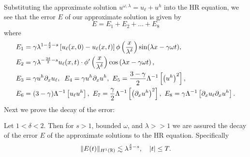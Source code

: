 Substituting the
approximate solution $u^{\omega, \lambda} = u_\ell + u^h$ into the HR
equation, we see that the error
$E$ of our approximate solution is given by
%
%
\begin{equation*}
E=E_1 + E_2 + \dots + E_8
\end{equation*}
%
%
where
%
%
\begin{equation}
\label{all_errors_together}
\begin{split}
E_1 & = \gamma \lambda^{1 -\frac{\delta}{2}-s}  \left[ u_\ell(x,0) - u_\ell(x,t)
\right] \phi\left(
\frac{x}{\lambda^ \delta}
\right)\sin(\lambda x - \gamma \omega t),
\\
E_2 & = \gamma \lambda^{-\frac{3\delta}{2}-s}
u_\ell(x,t) \cdot \phi'\left( \frac{x}{\lambda^\delta} \right)\cos\left( \lambda
x - \gamma \omega t
\right),
\\
E_3 & = \gamma u^h \p_x u_\ell, \; \; E_4 = \gamma u^h \p_x u^h, \ E_5  = 
\frac{3-\gamma}{2} \Lambda^{-1} \left[  \left( u^h \right)^2 \right], \\
E_6 & = (3- \gamma)\Lambda^{-1}
\left[ u_\ell u^h \right], \  E_7 = \frac{\gamma}{2} \Lambda^{-1} \left[ 
\left(
\p_x u^h \right)^2 \right ], \ E_8 = \gamma \Lambda^{-1} \left[  \p_x u_\ell \p_x u^h \right].
\end{split}
\end{equation}
%
%
%
Next we prove the decay of the error:
%
%
\begin{proposition}
Let $1<\delta<2$. Then for $s > 1$, bounded $\omega$, and
$\lambda >>1$ we are assured the decay of the error $E$ of the
approximate solutions to the HR equation. Specifically
%
%
%
\begin{equation}
\label{E-est}
\|E(t)\|_{H^1(\mathbb{R})} \lesssim \lambda^{\frac{\delta}{2} -s}, \quad |t| \le 
T.
\end{equation}
%
%
%
\end{proposition}
%
%
%
